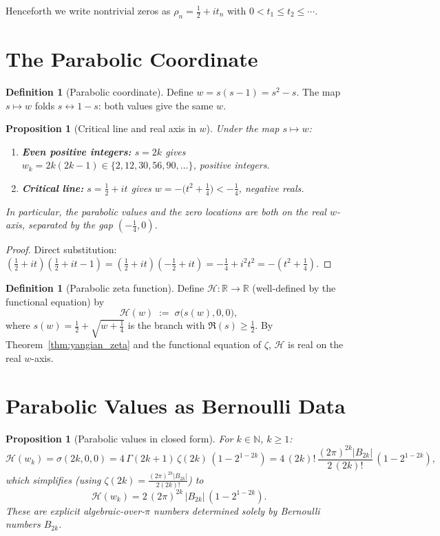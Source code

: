 \documentclass[%
 aip,
 amsmath,amssymb,
 reprint,%
]{revtex4-1}
\theoremstyle{plain}
\newtheorem{proposition}[theorem]{Proposition}
\theoremstyle{definition}
\newtheorem{definition}[theorem]{Definition}
\newcommand{\R}{\mathbb{R}}
\newcommand{\N}{\mathbb{N}}
\begin{document}
Henceforth we write nontrivial zeros as $\rho_n = \tfrac{1}{2}+it_n$ with $0<t_1\le t_2\le\cdots$.

\section{The Parabolic Coordinate}

\begin{definition}[Parabolic coordinate]\label{def:w}
Define $w = s(s-1) = s^2-s$.  The map $s\mapsto w$ folds $s\leftrightarrow 1-s$:
both values give the same $w$.
\end{definition}

\begin{proposition}[Critical line and real axis in $w$]\label{prop:w_values}
Under the map $s\mapsto w$:
\begin{enumerate}
\item \textbf{Even positive integers:} $s = 2k$ gives
  $w_k = 2k(2k-1)\in\{2,12,30,56,90,\ldots\}$, positive integers.
\item \textbf{Critical line:} $s = \tfrac{1}{2}+it$ gives
  $w = -\bigl(t^2+\tfrac{1}{4}\bigr)<-\tfrac{1}{4}$, negative reals.
\end{enumerate}
In particular, the parabolic values and the zero locations are both on the real
$w$-axis, separated by the gap $(-\tfrac{1}{4},0)$.
\end{proposition}

\begin{proof}
Direct substitution: $(\tfrac12+it)(\tfrac12+it-1)=(\tfrac12+it)(-\tfrac12+it)
= -\tfrac14+i^2t^2 = -(t^2+\tfrac14)$.
\end{proof}

\begin{definition}[Parabolic zeta function]\label{def:calH}
Define $\mathcal{H}:\R\to\R$ (well-defined by the functional equation) by
\[
\mathcal{H}(w) \;:=\; \sigma\!\bigl(s(w),0,0\bigr),
\]
where $s(w)=\tfrac{1}{2}+\sqrt{w+\tfrac{1}{4}}$ is the branch with $\Re(s)\ge\tfrac12$.
By Theorem~\ref{thm:yangian_zeta} and the functional equation of $\zeta$,
$\mathcal{H}$ is real on the real $w$-axis.
\end{definition}

\section{Parabolic Values as Bernoulli Data}

\begin{proposition}[Parabolic values in closed form]\label{prop:parabolic_values}
For $k\in\N$, $k\ge 1$:
\[
\mathcal{H}(w_k) = \sigma(2k,0,0) = 4\,\Gamma(2k+1)\,\zeta(2k)\,(1-2^{1-2k})
= 4\,(2k)!\,\frac{(2\pi)^{2k}|B_{2k}|}{2\,(2k)!}\,(1-2^{1-2k}),
\]
which simplifies (using $\zeta(2k)=\tfrac{(2\pi)^{2k}|B_{2k}|}{2(2k)!}$) to
\[
\boxed{\mathcal{H}(w_k) = 2\,(2\pi)^{2k}\,|B_{2k}|\,(1-2^{1-2k})}.
\]
These are explicit algebraic-over-$\pi$ numbers determined solely by Bernoulli
numbers $B_{2k}$.
\end{proposition}
\end{document}
